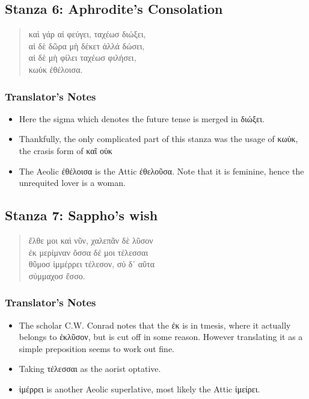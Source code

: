 \subsection*{Stanza 6: Aphrodite's Consolation}
\begin{quote}
  καὶ γάρ αἰ φεύγει, ταχέωσ διώξει,\\
  αἰ δὲ δῶρα μὴ δέκετ ἀλλά δώσει,\\
  αἰ δὲ μὴ φίλει ταχέωσ φιλήσει,\\
  κωὐκ ἐθέλοισα.
\end{quote}

\subsubsection*{Translator's Notes}
\begin{itemize}
  \item Here the sigma which denotes the future tense is merged in διώξει.
  \item Thankfully, the only complicated part of this stanza was the usage of κωὐκ, the crasis form of καῖ οὐκ
  \item The Aeolic ἐθέλοισα is the Attic ἐθελοῦσα. Note that it is feminine, hence the unrequited lover is a woman.
\end{itemize}

\subsection*{Stanza 7: Sappho's wish}
\begin{quote}
  ἔλθε μοι καὶ νῦν, χαλεπᾶν δὲ λῦσον\\
  ἐκ μερίμναν ὄσσα δέ μοι τέλεσσαι\\
  θῦμοσ ἰμμέρρει τέλεσον, σὐ δ᾽ αὔτα\\
  σύμμαχοσ ἔσσο.
\end{quote}

\subsubsection*{Translator's Notes}
\begin{itemize}
  \item The scholar C.W. Conrad notes that the ἐκ is in tmesis, where it actually belongs to ἐκλῦσον, but is cut off in some reason. However translating it as a simple preposition seems to work out fine.
  \item Taking τέλεσσαι as the aorist optative.
  \item ἰμέρρει is another Aeolic superlative, most likely the Attic ἱμείρει.
\end{itemize}
